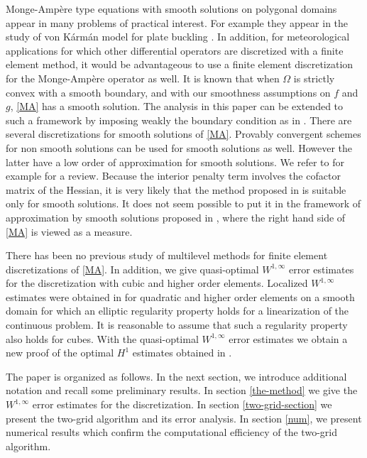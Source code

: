 \documentclass[12pt]{amsart}
\numberwithin{equation}{section}
\newcommand{\edit}[1]{{\color{blue} #1}}
\begin{document}
Monge-Amp\`ere type equations with smooth solutions on polygonal domains appear in many problems of practical interest. For example they appear in the study of von K\'arm\'an model for plate buckling \cite{Brenner2017a}. In addition, for meteorological applications for which other differential operators are discretized with a finite element method, it would be advantageous to use a finite element discretization for the Monge-Amp\`ere operator as well. It is known that when $\Omega$ is strictly convex with a smooth boundary, and with our smoothness assumptions on $f$ and $g$, \eqref{MA} has a smooth solution. The analysis in this paper can be extended to such a framework by imposing weakly the boundary condition as in \cite{Brenner2010b}. There are several discretizations for smooth solutions of \eqref{MA}. Provably convergent schemes for non smooth solutions can be used for smooth solutions as well. However the latter have a low order of approximation for smooth solutions. We refer to \cite{Feng2013} for example for a review.  Because the interior penalty term involves the cofactor matrix of the Hessian, it is very likely that the method proposed in \cite{Brenner2010b} is suitable only for smooth solutions. It does not seem possible to put it in the framework of approximation by smooth solutions proposed in \cite{Awanou-Std04}, where the right hand side of \eqref{MA} is viewed as a measure. 

There has been no previous study of multilevel methods for finite element discretizations of \eqref{MA}. In addition, we
give quasi-optimal $W^{1,\infty}$ error estimates for the discretization with cubic and higher order elements. Localized  $W^{1,\infty}$ estimates were obtained in \cite{Neilan2013b} for quadratic and higher order elements on a smooth domain for which an elliptic regularity property holds for a linearization of the continuous problem. It is reasonable to assume that such a regularity property also holds for cubes. %
With the quasi-optimal $W^{1,\infty}$ error estimates we obtain a new proof of the optimal $H^1$ estimates obtained in \cite{Brenner2010b}.  %
 
 The paper is organized as follows. In the next section, we introduce additional notation and recall some preliminary results. 
 In section \ref{the-method} we %
 give the $W^{1,\infty}$ error estimates for the discretization. %
 In section \ref{two-grid-section} we present the two-grid algorithm and its error analysis. 
In section \ref{num}, we present numerical results which confirm the computational efficiency of the two-grid algorithm.
 
\end{document}
